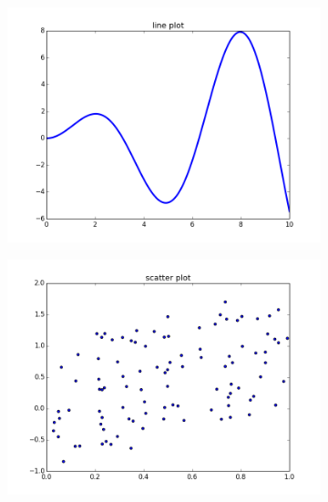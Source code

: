 \begin{figure}
\centering
\begin{subfigure}{.3\textwidth}
\centering
\includegraphics[width=\textwidth]{line_plot.png}
\end{subfigure}
\begin{subfigure}{.3\textwidth}
  \centering
  \includegraphics[width=\textwidth]{scatter_plot.png}
\end{subfigure}
\begin{subfigure}{.3\textwidth}
  \centering

\end{subfigure}
\end{figure}
